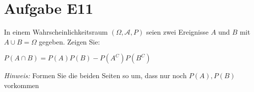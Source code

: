 \section{Aufgabe E11}
In einem Wahrscheinlichkeitsraum $(\Omega, \mathcal A , P )$ seien zwei Ereignisse $A$ und $B$ mit $A \cup B = \Omega$ gegeben. Zeigen Sie:
\begin{center}
 $P(A \cap B) = P(A)P(B) - P(A^C)P(B^C)$
\end{center}
\textit{Hinweis:} Formen Sie die beiden Seiten so um, dass nur noch $P(A),P(B)$ vorkommen